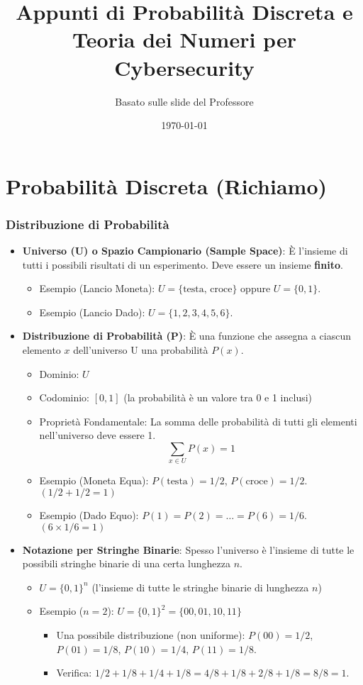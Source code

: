 \documentclass{article}
\title{\color{headercolor}Appunti di Probabilità Discreta e Teoria dei Numeri per Cybersecurity}
\author{Basato sulle slide del Professore}
\date{\today}
\begin{document}
\maketitle
\tableofcontents
\newpage

\part{Probabilità Discreta (Richiamo)}

\section{Distribuzione di Probabilità}

\begin{itemize}
    \item \textbf{Universo (U) o Spazio Campionario (Sample Space)}: È l'insieme di tutti i possibili risultati di un esperimento. Deve essere un insieme \textbf{finito}.
    \begin{itemize}
        \item Esempio (Lancio Moneta): $U = \{ \text{testa, croce} \}$ oppure $U = \{0, 1\}$.
        \item Esempio (Lancio Dado): $U = \{1, 2, 3, 4, 5, 6\}$.
    \end{itemize}
    \item \textbf{Distribuzione di Probabilità (P)}: È una funzione che assegna a ciascun elemento $x$ dell'universo U una probabilità $P(x)$.
    \begin{itemize}
        \item Dominio: $U$
        \item Codominio: $[0, 1]$ (la probabilità è un valore tra 0 e 1 inclusi)
        \item Proprietà Fondamentale: La somma delle probabilità di tutti gli elementi nell'universo deve essere 1.
        \[ \sum_{x \in U} P(x) = 1 \]
        \item Esempio (Moneta Equa): $P(\text{testa}) = 1/2$, $P(\text{croce}) = 1/2$. $(1/2 + 1/2 = 1)$
        \item Esempio (Dado Equo): $P(1) = P(2) = \dots = P(6) = 1/6$. $(6 \times 1/6 = 1)$
    \end{itemize}
    \item \textbf{Notazione per Stringhe Binarie}: Spesso l'universo è l'insieme di tutte le possibili stringhe binarie di una certa lunghezza $n$.
    \begin{itemize}
        \item $U = \{0,1\}^n$ (l'insieme di tutte le stringhe binarie di lunghezza $n$)
        \item Esempio ($n=2$): $U = \{0,1\}^2 = \{00, 01, 10, 11\}$
            \begin{itemize}
                \item Una possibile distribuzione (non uniforme): $P(00) = 1/2$, $P(01) = 1/8$, $P(10) = 1/4$, $P(11) = 1/8$.
                \item Verifica: $1/2 + 1/8 + 1/4 + 1/8 = 4/8 + 1/8 + 2/8 + 1/8 = 8/8 = 1$.
            \end{itemize}
    \end{itemize}
\end{itemize}
\end{document}
